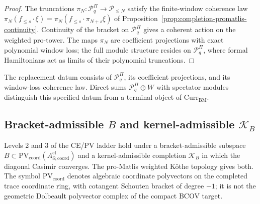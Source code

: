 \begin{proof}
The truncations \(\pi_N:\mathcal P^\Pi_q\to\mathcal P_{\le N}\) satisfy
the finite-window coherence law
\(\pi_N(f_{\le s}\cdot\xi)=\pi_N(f_{\le s}\cdot\pi_{N+s}\xi)\) of
Proposition~\ref{prop:completion-promatlis-continuity}.  Continuity of
the bracket on \(\mathcal P^\Pi_q\) gives a coherent action on the
weighted pro-tower.  The maps \(\pi_N\) are coefficient projections
with exact polynomial window loss; the full module structure resides
on \(\mathcal P^\Pi_q\), where formal Hamiltonians act as limits of
their polynomial truncations.
\end{proof}

\begin{rmk}
\label{rmk:completion-currbm-category}
The replacement datum consists of
\(\mathcal P^\Pi_q\), its coefficient projections, and its
window-loss coherence law.  Direct sums
\(\mathcal P^\Pi_q\oplus W\) with spectator modules distinguish this
specified datum from a terminal object of
\(\mathrm{Curr}_{\mathrm{BM}}\).
\end{rmk}

\subsection{\texorpdfstring{Bracket-admissible \(B\) and kernel-admissible \(\mathcal K_B\)}{Bracket-admissible B and kernel-admissible K-B}}
\label{ssec:completion-bracket-kernel-admissible}

Levels 2 and 3 of the CE/PV ladder hold under a
bracket-admissible subspace
\(B\subset\mathrm{PV}_{\mathrm{coord}}(A^{\mathrm{cl}}_{\partial,\mathrm{coord}})\)
and a kernel-admissible completion \(\mathcal K_B\) in which the
diagonal Casimir converges.  The pro-Matlis weighted
K\"othe topology gives both.  The symbol
\(\mathrm{PV}_{\mathrm{coord}}\) denotes algebraic coordinate
polyvectors on the completed trace coordinate ring, with cotangent
Schouten bracket of degree \(-1\); it is not the geometric Dolbeault
polyvector complex of the compact BCOV target.

